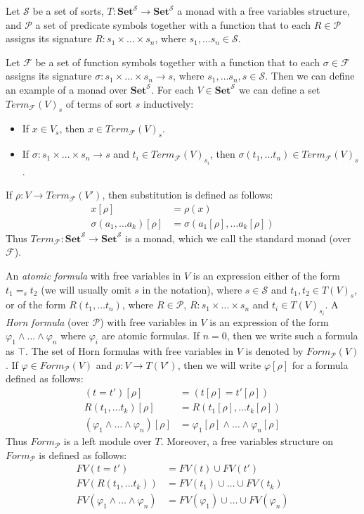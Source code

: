 \documentclass[reqno]{amsart}
\theoremstyle{definition}
\theoremstyle{remark}
\newcommand{\cat}[1]{\mathbf{#1}}
\newcommand{\Set}{\cat{Set}}
\numberwithin{figure}{section}
\begin{document}
Let $\mathcal{S}$ be a set of sorts, $T : \Set^\mathcal{S} \to \Set^\mathcal{S}$ a monad with a free variables structure,
    and $\mathcal{P}$ a set of predicate symbols together with a function that to each $R \in \mathcal{P}$
    assigns its signature $R : s_1 \times \ldots \times s_n$, where $s_1, \ldots s_n \in \mathcal{S}$.

Let $\mathcal{F}$ be a set of function symbols together with a function that to each $\sigma \in \mathcal{F}$ assigns its signature $\sigma : s_1 \times \ldots \times s_n \to s$, where $s_1, \ldots s_n, s \in \mathcal{S}$.
Then we can define an example of a monad over $\Set^\mathcal{S}$.
For each $V \in \Set^\mathcal{S}$ we can define a set $Term_\mathcal{F}(V)_s$ of terms of sort $s$ inductively:
\begin{itemize}
\item If $x \in V_s$, then $x \in Term_\mathcal{F}(V)_s$.
\item If $\sigma : s_1 \times \ldots \times s_n \to s$ and $t_i \in Term_\mathcal{F}(V)_{s_i}$, then $\sigma(t_1, \ldots t_n) \in Term_\mathcal{F}(V)_s$.
\end{itemize}
If $\rho : V \to Term_\mathcal{F}(V')$, then substitution is defined as follows:
\begin{align*}
x[\rho] & = \rho(x) \\
\sigma(a_1, \ldots a_k)[\rho] & = \sigma(a_1[\rho], \ldots a_k[\rho])
\end{align*}
Thus $Term_\mathcal{F} : \Set^\mathcal{S} \to \Set^\mathcal{S}$ is a monad, which we call the standard monad (over $\mathcal{F}$).

An \emph{atomic formula} with free variables in $V$ is an expression either of the form $t_1 =_s t_2$ (we will usually omit $s$ in the notation),
    where $s \in \mathcal{S}$ and $t_1, t_2 \in T(V)_s$, or of the form $R(t_1, \ldots t_n)$, where $R \in \mathcal{P}$, $R : s_1 \times \ldots \times s_n$ and $t_i \in T(V)_{s_i}$.
A \emph{Horn formula} (over $\mathcal{P}$) with free variables in $V$ is an expression of the form $\varphi_1 \land \ldots \land \varphi_n$ where $\varphi_i$ are atomic formulas.
If $n = 0$, then we write such a formula as $\top$.
The set of Horn formulas with free variables in $V$ is denoted by $Form_\mathcal{P}(V)$.
If $\varphi \in Form_\mathcal{P}(V)$ and $\rho : V \to T(V')$, then we will write $\varphi[\rho]$ for a formula defined as follows:
\begin{align*}
(t = t')[\rho] & = (t[\rho] = t'[\rho]) \\
R(t_1, \ldots t_k)[\rho] & = R(t_1[\rho], \ldots t_k[\rho]) \\
(\varphi_1 \land \ldots \land \varphi_n)[\rho] & = \varphi_1[\rho] \land \ldots \land \varphi_n[\rho]
\end{align*}
Thus $Form_\mathcal{P}$ is a left module over $T$.
Moreover, a free variables structure on $Form_\mathcal{P}$ is defined as follows:
\begin{align*}
FV(t = t') & = FV(t) \cup FV(t') \\
FV(R(t_1, \ldots t_k)) & = FV(t_1) \cup \ldots \cup FV(t_k) \\
FV(\varphi_1 \land \ldots \land \varphi_n) & = FV(\varphi_1) \cup \ldots \cup FV(\varphi_n)
\end{align*}
\end{document}
